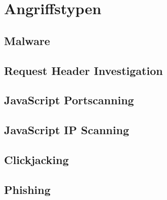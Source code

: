 \section{Angriffstypen}

\subsection{Malware}

\subsection{Request Header Investigation}

\subsection{JavaScript Portscanning}

\subsection{JavaScript IP Scanning}

\subsection{Clickjacking}

\subsection{Phishing}
